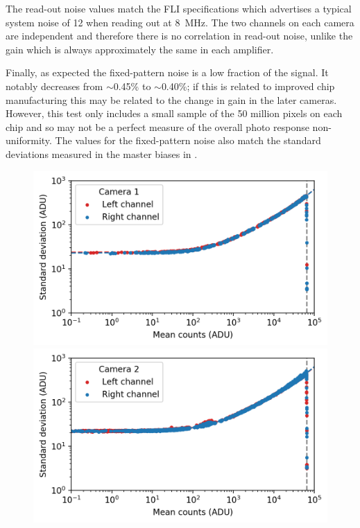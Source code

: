 \begin{colsection}
\begin{colsection}
The read-out noise values match the FLI specifications which advertises a typical system noise of 12 \elec{} when reading out at \SI{8}{\mega\hertz}. The two channels on each camera are independent and therefore there is no correlation in read-out noise, unlike the gain which is always approximately the same in each amplifier.

Finally, as expected the fixed-pattern noise is a low fraction of the signal. It notably decreases from $\sim$0.45\% to $\sim$0.40\%; if this is related to improved chip manufacturing this may be related to the change in gain in the later cameras. However, this test only includes a small sample of the 50 million pixels on each chip and so may not be a perfect measure of the overall photo response non-uniformity. The values for the fixed-pattern noise also match the standard deviations measured in the master biases in .

\begin{figure}[p]
    \begin{center}
        \begin{minipage}[t]{0.49\textwidth}\vspace{10pt}
            \includegraphics[width=\linewidth]{images/detectors/ptc_1.png}
        \end{minipage}
        \begin{minipage}[t]{0.49\textwidth}\vspace{10pt}
            \includegraphics[width=\linewidth]{images/detectors/ptc_2.png}
        \end{minipage}


\end{center}
\end{figure}
\end{colsection}
\end{colsection}
